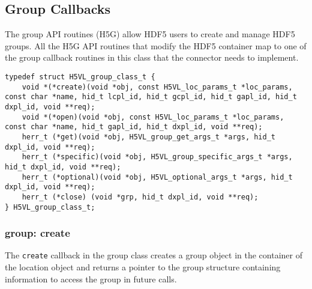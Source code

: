 
\subsection{Group Callbacks}
The group API routines (H5G) allow HDF5 users to create and manage
HDF5 groups. All the H5G API routines that modify the HDF5 container
map to one of the group callback routines in this class that the
connector needs to implement.

\begin{lstlisting}[caption={Structure for group callback routines, H5VLconnector.h}, captionpos=b, label={lst:Groupclass}]
typedef struct H5VL_group_class_t {                                              
    void *(*create)(void *obj, const H5VL_loc_params_t *loc_params, const char *name, hid_t lcpl_id, hid_t gcpl_id, hid_t gapl_id, hid_t dxpl_id, void **req);
    void *(*open)(void *obj, const H5VL_loc_params_t *loc_params, const char *name, hid_t gapl_id, hid_t dxpl_id, void **req);
    herr_t (*get)(void *obj, H5VL_group_get_args_t *args, hid_t dxpl_id, void **req);
    herr_t (*specific)(void *obj, H5VL_group_specific_args_t *args, hid_t dxpl_id, void **req);
    herr_t (*optional)(void *obj, H5VL_optional_args_t *args, hid_t dxpl_id, void **req);
    herr_t (*close) (void *grp, hid_t dxpl_id, void **req);
} H5VL_group_class_t; 
\end{lstlisting}

\subsubsection{group: create}
The \texttt{create} callback in the group class creates a group
object in the container of the location object and returns a pointer
to the group structure containing information to access the group in
future calls.\bigskip

